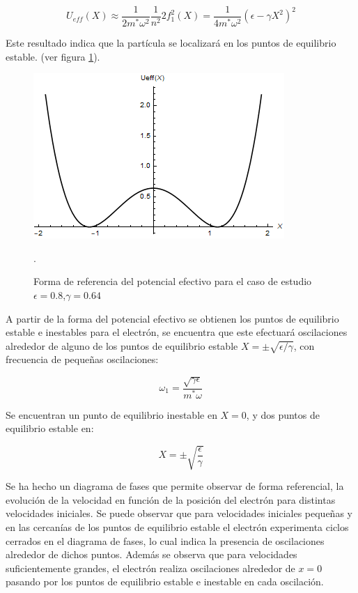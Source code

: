 \begin{equation}\label{eq:9.38}
    U_{eff}(X) \approx  \frac{1}{2m^*\omega^2} \frac{1}{n^2} 2f_1^2(X)=\frac{1}{4m^*\omega^2}(\epsilon-\gamma X^2)^2
\end{equation}

Este resultado indica que la partícula se localizará en los puntos de equilibrio estable. (ver figura \ref{fig:9.1}). 

\begin{figure}[H]
    \centering
    \includegraphics[scale=.7]{imagenes/sech-aprox.png}
    \caption{Forma de referencia del potencial efectivo para el caso de estudio $\epsilon=0.8$,$\gamma=0.64$ }.
    \label{fig:9.1}
\end{figure}

A partir de la forma del potencial efectivo se obtienen los puntos de equilibrio estable e inestables para el electrón, se encuentra que este efectuará oscilaciones alrededor de alguno de los puntos de equilibrio estable $X=\pm \sqrt{\epsilon/\gamma}$, con frecuencia de pequeñas oscilaciones:

\begin{equation}\label{eq:9.39}
    \omega_1=\frac{\sqrt{\gamma\epsilon}}{ m^*\omega}
\end{equation}

Se encuentran un punto de equilibrio inestable en $X=0$, y dos puntos de equilibrio estable en:

\begin{equation}\label{eq:9.40}
    X=\pm \sqrt{\frac{\epsilon}{\gamma}}
\end{equation}

Se ha hecho un diagrama de fases que permite observar de forma referencial, la evolución de la velocidad en función de la posición del electrón para distintas velocidades iniciales. Se puede observar que para velocidades iniciales pequeñas y en las cercanías de los puntos de equilibrio estable el electrón experimenta ciclos cerrados en el diagrama de fases, lo cual indica la presencia de oscilaciones alrededor de dichos puntos. Además se observa que para velocidades suficientemente grandes, el electrón realiza oscilaciones alrededor de $x=0$ pasando por los puntos de equilibrio estable e inestable en cada oscilación.

